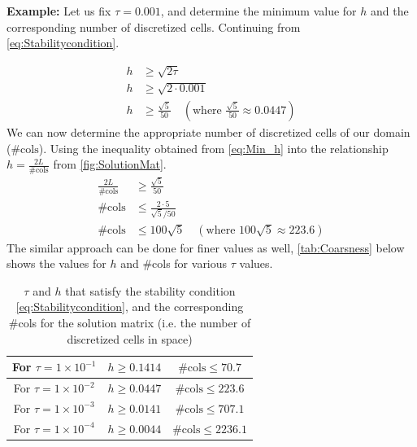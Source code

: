 \vspace{1mm}
\textbf{Example:} Let us fix $\tau = 0.001$, and determine the minimum value for $h$ and the corresponding number of discretized cells. Continuing from \autoref{eq:Stabilitycondition}. 


\begin{equation}
    \begin{aligned}
        h&\geq\sqrt{2\tau} \\
        h&\geq\sqrt{2\cdot 0.001} \\ 
        h&\geq\frac{\sqrt{5}}{50} \quad (\text{where } \frac{\sqrt{5}}{50} \approx 0.0447)
    \end{aligned}
    \label{eq:Min_h}
\end{equation}
We can now determine the appropriate number of discretized cells of our domain ($\text{\#cols}$). Using the inequality obtained from \autoref{eq:Min_h} into the relationship $h = \frac{2L}{\text{\#cols}}$ from \autoref{fig:SolutionMat}.
\begin{equation}
    \begin{aligned}
        \frac{2L}{\text{\#cols}} &\geq \frac{\sqrt{5}}{50} \\
        \text{\#cols} &\leq \frac{2\cdot5}{\sqrt{5}/50}\\
        \text{\#cols} &\leq 100\sqrt{5} \quad (\text{where } 100\sqrt{5} \approx 223.6)
    \end{aligned}
\end{equation}
The similar approach can be done for finer values as well, \autoref{tab:Coarsness} below shows the values for $h$ and \#cols for various $\tau$ values.
\begin{table}[H]
    \centering
    \renewcommand{\arraystretch}{1.5}
    \begin{tabular}{|c|c|c|}
        \hline
        For $\tau = 1\times10^{-1}$ & $h \geq 0.1414$ & $\text{\#cols}\leq70.7$ \\
        \hline
        For $\tau = 1\times10^{-2}$ & $h \geq 0.0447$ & $\text{\#cols}\leq223.6$ \\
        \hline
        For $\tau = 1\times10^{-3}$ & $h \geq  0.0141$ & $\text{\#cols}\leq707.1$ \\
        \hline
        For $\tau = 1\times10^{-4}$ & $h \geq  0.0044$ & $\text{\#cols}\leq2236.1$ \\
        \hline
    \end{tabular}
    \caption{$\tau$ and $h$ that satisfy the stability condition \autoref{eq:Stabilitycondition}, and the corresponding \#cols for the solution matrix (i.e. the number of discretized cells in space) }
    \label{tab:Coarsness}
\end{table}

